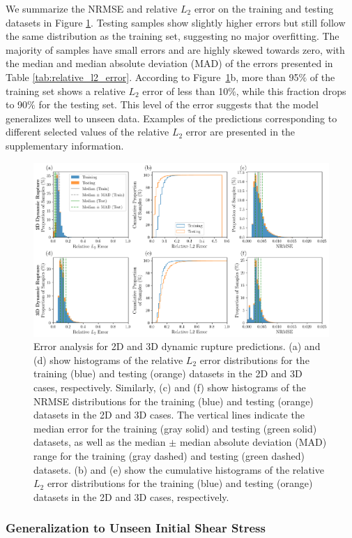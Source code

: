 \documentclass[draft]{agujournal2019}
\begin{document}
We summarize the NRMSE and relative \(L_2\) error on the training and testing datasets in Figure \ref{fig:l2}. Testing samples show slightly higher errors but still follow the same distribution as the training set, suggesting no major overfitting. The majority of samples have small errors and are highly skewed towards zero, with the median and median absolute deviation (MAD) of the errors presented in Table \ref{tab:relative_l2_error}. According to Figure~\ref{fig:l2}b, more than 95\(\%\) of the training set shows a relative \(L_2\) error of less than 10\(\%\), while this fraction drops to 90\(\%\) for the testing set. This level of the error suggests that the model generalizes well to unseen data. Examples of the predictions corresponding to different selected values of the relative \(L_2\) error are presented in the supplementary information.

\begin{figure}
\centering
\includegraphics[width=0.9\linewidth]{stats.png}
\caption{\label{fig:l2}Error analysis for 2D and 3D dynamic rupture predictions. (a) and (d) show histograms of the relative $L_2$ error distributions for the training (blue) and testing (orange) datasets in the 2D and 3D cases, respectively. Similarly, (c) and (f) show histograms of the NRMSE distributions for the training (blue) and testing (orange) datasets in the 2D and 3D cases. The vertical lines indicate the median error for the training (gray solid) and testing (green solid) datasets, as well as the median $\pm$ median absolute deviation (MAD) range for the training (gray dashed) and testing (green dashed) datasets. (b) and (e) show the cumulative histograms of the relative $L_2$ error distributions for the training (blue) and testing (orange) datasets in the 2D and 3D cases, respectively.
}
\end{figure}


\subsubsection{Generalization to Unseen Initial Shear Stress}
\label{sec:FNO-1D_unseen_shear}
\end{document}
